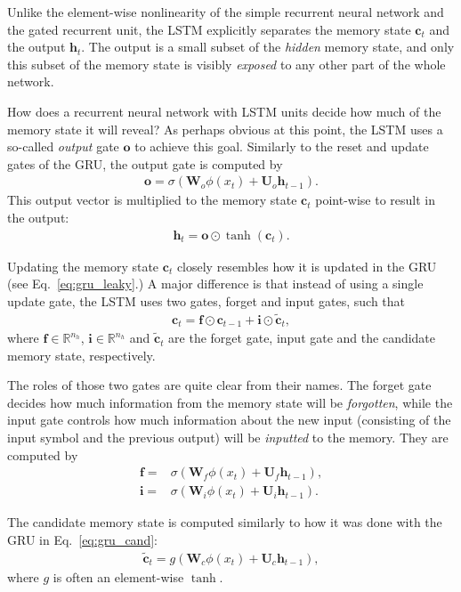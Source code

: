 \documentclass{report}
\newcommand{\vect}[1]{\mathbf{#1}}
\newcommand{\matr}[1]{\mathbf{#1}}
\newcommand{\vc}[0]{\vect{c}}
\newcommand{\vh}[0]{\vect{h}}
\newcommand{\vf}[0]{\vect{f}}
\newcommand{\vi}[0]{\vect{i}}
\newcommand{\vo}[0]{\vect{o}}
\newcommand{\mW}[0]{\matr{W}}
\newcommand{\mU}[0]{\matr{U}}
\newcommand{\RR}[0]{\mathbb{R}}
\newcommand{\sigmoid}{\sigma}
\begin{document}
Unlike the element-wise nonlinearity of the simple recurrent neural network and
the gated recurrent unit, the LSTM explicitly separates the memory state $\vc_t$
and the output $\vh_t$. The output is a small subset of the {\em hidden} memory
state, and only this subset of the memory state is visibly {\em exposed} to any
other part of the whole network. 

How does a recurrent neural network with LSTM units decide how much of the
memory state it will reveal?  As perhaps obvious at this point, the LSTM uses a
so-called {\em output} gate $\vo$ to achieve this goal. Similarly to the reset
and update gates of the GRU, the output gate is computed by
\begin{align*}
    \vo = \sigmoid(\mW_o \phi(x_t) + \mU_o \vh_{t-1}).
\end{align*}
This output vector is multiplied to the memory state $\vc_t$ point-wise to
result in the output:
\begin{align*}
    \vh_t = \vo \odot \tanh(\vc_t).
\end{align*}

Updating the memory state $\vc_t$ closely resembles how it is updated in the GRU
(see Eq.~\eqref{eq:gru_leaky}.) A major difference is that instead of using a
single update gate, the LSTM uses two gates, forget and input gates, such that
\begin{align*}
    \vc_t = \vf \odot \vc_{t-1} + \vi \odot \tilde{\vc}_t,
\end{align*}
where $\vf \in \RR^{n_h}$, $\vi \in \RR^{n_h}$ and $\tilde{\vc}_t$ are the
forget gate, input gate and the candidate memory state, respectively.

The roles of those two gates are quite clear from their names. The forget gate
decides how much information from the memory state will be {\em forgotten},
while the input gate controls how much information about the new input
(consisting of the input symbol and the previous output) will be {\em inputted}
to the memory. They are computed by
\begin{align}
    \label{eq:lstm_forget}
    \vf =& \sigmoid(\mW_f \phi(x_t) + \mU_f \vh_{t-1}), 
    \\
    \vi =& \sigmoid(\mW_i \phi(x_t) + \mU_i \vh_{t-1}).
    \nonumber
\end{align}

The candidate memory state is computed similarly to how it was done with the GRU
in Eq.~\eqref{eq:gru_cand}:
\begin{align}
    \tilde{\vc}_t = g(\mW_c \phi(x_t) + \mU_c \vh_{t-1}),
\end{align}
where $g$ is often an element-wise $\tanh$.
\end{document}
